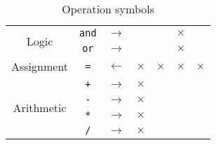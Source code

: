 \begin{table}[h!]
\begin{tabular}{ |c|c|c||c|c|c|c| }
        \multirow{2}{*}{Logic}
                          & \texttt{and}
                          & $\rightarrow$
                          &
                          &
                          & $\times$
                          &
        \\

                          & \texttt{or}
                          & $\rightarrow$
                          &
                          &
                          & $\times$
                          &
        \\\hline

        Assignment
                          & \texttt{=}
                          & $\leftarrow$
                          & $\times$
                          & $\times$
                          & $\times$
                          & $\times$
        \\\hline

        \multirow{4}{*}{Arithmetic}
                          & \texttt{+}
                          & $\rightarrow$
                          & $\times$
                          &
                          &
                          &
        \\


                          & \texttt{-}
                          & $\rightarrow$
                          & $\times$
                          &
                          &
                          &
        \\

                          & \texttt{*}
                          & $\rightarrow$
                          & $\times$
                          &
                          &
                          &
        \\

                          & \texttt{/}
                          & $\rightarrow$
                          & $\times$
                          &
                          &
                          &
        \\\hline
    \end{tabular}
    \caption{Operation symbols}
    \label{table:operatorsymbols}
\end{table}